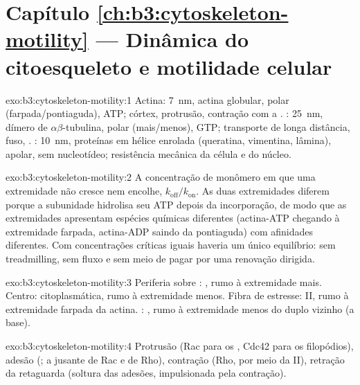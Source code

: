 \section*{Capítulo \ref{ch:b3:cytoskeleton-motility} --- Dinâmica do citoesqueleto e motilidade celular}

\begin{solution}{exo:b3:cytoskeleton-motility:1}
Actina: \qty{7}{nm}, actina globular, polar (farpada/pontiaguda), ATP;
córtex, protrusão, contração com a . : \qty{25}{nm},
dímero de $\alpha\beta$-tubulina, polar (mais/menos), GTP; transporte
de longa distância, fuso, . :
\qty{10}{nm}, proteínas em hélice enrolada (queratina, vimentina,
lâmina), apolar, sem nucleotídeo; resistência mecânica da célula e do
núcleo.
\end{solution}

\begin{solution}{exo:b3:cytoskeleton-motility:2}
A concentração de monômero em que uma extremidade não cresce nem
encolhe, $k_{\text{off}}/k_{\text{on}}$. As duas extremidades diferem
porque a subunidade hidrolisa seu ATP depois da incorporação, de modo
que as extremidades apresentam espécies químicas diferentes
(actina-ATP chegando à extremidade farpada, actina-ADP saindo da
pontiaguda) com afinidades diferentes. Com concentrações críticas
iguais haveria um único equilíbrio: sem treadmilling, sem fluxo e sem
meio de pagar por uma renovação dirigida.
\end{solution}

\begin{solution}{exo:b3:cytoskeleton-motility:3}
Periferia sobre : , rumo à extremidade mais.
Centro:  citoplasmática, rumo à extremidade menos. Fibra de
estresse:  II, rumo à extremidade farpada da actina. :
, rumo à extremidade menos do duplo vizinho (a base).
\end{solution}

\begin{solution}{exo:b3:cytoskeleton-motility:4}
Protrusão (Rac para os , Cdc42 para os filopódios), adesão
(; a jusante de Rac e de Rho), contração (Rho, por meio da
 II), retração da retaguarda (soltura das adesões, impulsionada
pela contração).
\end{solution}

